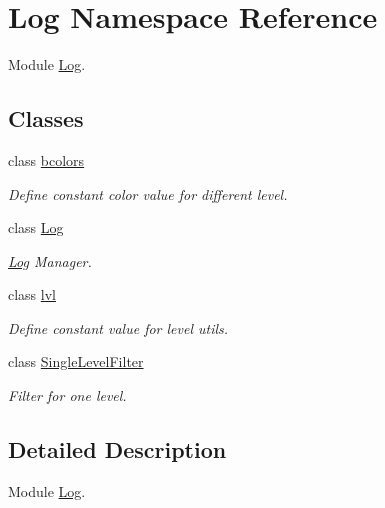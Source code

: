 \hypertarget{namespace_log}{}\section{Log Namespace Reference}
\label{namespace_log}


Module \hyperlink{namespace_log}{Log}.  


\subsection*{Classes}
\begin{DoxyCompactItemize}
\item 
class \hyperlink{class_log_1_1bcolors}{bcolors}
\begin{DoxyCompactList}\small\item\em Define constant color value for different level. \end{DoxyCompactList}\item 
class \hyperlink{class_log_1_1_log}{Log}
\begin{DoxyCompactList}\small\item\em \hyperlink{class_log_1_1_log}{Log} Manager. \end{DoxyCompactList}\item 
class \hyperlink{class_log_1_1lvl}{lvl}
\begin{DoxyCompactList}\small\item\em Define constant value for level utils. \end{DoxyCompactList}\item 
class \hyperlink{class_log_1_1_single_level_filter}{Single\+Level\+Filter}
\begin{DoxyCompactList}\small\item\em Filter for one level. \end{DoxyCompactList}\end{DoxyCompactItemize}


\subsection{Detailed Description}
Module \hyperlink{namespace_log}{Log}. 